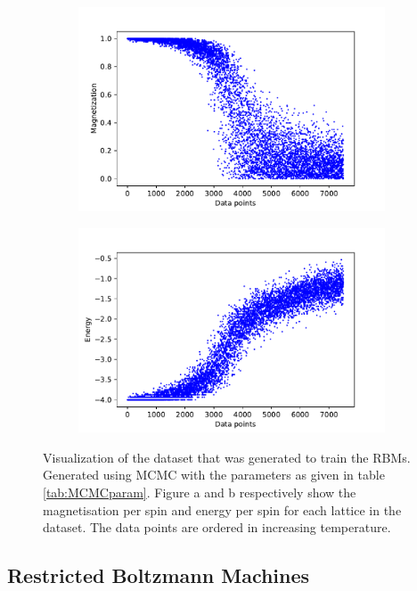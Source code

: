 \documentclass[10 pt, a4paper]{article}
\begin{document}
\begin{figure}[H] 
\begin{subfigure}[b]{0.5\textwidth}
  \centering
    \includegraphics[width=\textwidth]{mag}
    \subcaption{}
\end{subfigure}
\begin{subfigure}[b]{0.5\textwidth} 
  \centering
    \includegraphics[width=\textwidth]{energy}
    \subcaption{}
\end{subfigure}
\caption{Visualization of the dataset that was generated to train the RBMs. Generated using MCMC with the parameters as given in table \ref{tab:MCMCparam}. Figure a and b respectively show the magnetisation per spin and energy per spin for each lattice in the dataset. The data points are ordered in increasing temperature.}
  \label{fig:dataset}
\end{figure}

\subsection{Restricted Boltzmann Machines}
\end{document}
